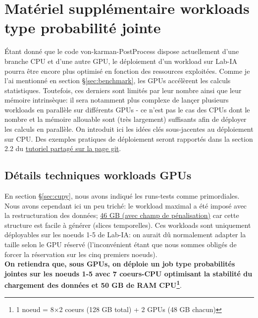 \documentclass[13pt, a4paper]{extarticle}
\begin{document}
\section{Matériel supplémentaire workloads type probabilité jointe}
\noindent Étant donné que le code von-karman-PostProcess dispose actuellement d'une
branche CPU et d'une autre GPU, le déploiement d'un workload sur Lab-IA pourra 
être encore plus optimisé en fonction des ressources exploitées. Comme je l'ai
mentionné en section \S \ref{sec:benchmark},
les GPUs accélèrent les calculs statistiques. Toutefois, ces derniers
sont limités par leur nombre ainsi que leur mémoire intrinsèque: il sera notamment plus complexe
de lançer plusieurs workloads en parallèle sur différents GPUs - ce n'est pas le cas
des CPUs dont le nombre et la mémoire allouable sont (très largement) suffisants
afin de déployer les calculs en parallèle. On introduit ici les idées clés sous-jacentes au
déploiement sur CPU. Des exemples pratiques de déploiement seront rapportés
dans la section 2.2 du \href{https://gitlab.lisn.upsaclay.fr/allaglo/von-karman-postprocess/-/blob/main/tutorial/tutorial.ipynb}
{tutoriel partagé sur la page git}. 

\subsection{Détails techniques workloads GPUs}\label{sec:tech_workloads}
\noindent En section \S \ref{sec:cupy}, nous avons indiqué
les runs-tests comme primordiales. Nous avons cependant ici un peu triché: 
le workload maximal a été imposé avec la restructuration des données; \ul{46 GB (avec 
champ de p\'enalisation)} car cette structure est facile à 
générer (slices temporelles). Ces workloads sont uniquement déployables sur les
noeuds 1-5 de Lab-IA: on aurait dû normalement adapter la taille selon 
le GPU réservé (l'inconvénient étant que nous sommes obligés de forcer la réservation 
sur les cinq premiers noeuds). \\
{\bf On retiendra que, sous GPUs, on déploie un job type probabilités jointes sur les noeuds
1-5 avec 7 coeurs-CPU optimisant la stabilité du chargement des données
et 50 GB de RAM CPU\footnote{1 noeud = 8$\times$2 coeurs (128 GB total) + 2 GPUs (48 GB chacun)}}.
\end{document}
